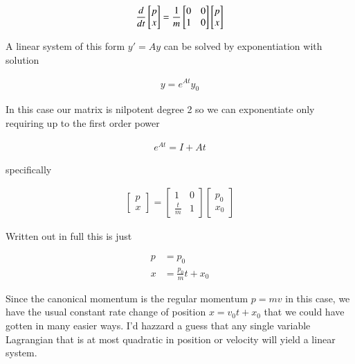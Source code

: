 \begin{align}\label{eqn:hamiltonian:boo4}
\frac{d}{dt}
\begin{bmatrix}
p \\
x
\end{bmatrix}
=
\frac{1}{m}
\begin{bmatrix}
0 & 0 \\
1 & 0
\end{bmatrix}
\begin{bmatrix}
p \\
x
\end{bmatrix}
\end{align}

A linear system of this form $y' = A y$ can be solved by exponentiation with solution

\begin{align}\label{eqn:hamiltonian:boo5}
y = e^{A t} y_0
\end{align}

In this case our matrix is nilpotent degree 2 so we can exponentiate only requiring up to the first order power

\begin{align}\label{eqn:hamiltonian:boo6}
e^{A t} = I + A t
\end{align}

specifically

\begin{align}\label{eqn:hamiltonian:boo7}
\begin{bmatrix}
p \\
x
\end{bmatrix}
=
\begin{bmatrix}
1 & 0 \\
\frac{t}{m} & 1
\end{bmatrix}
\begin{bmatrix}
p_0 \\
x_0
\end{bmatrix}
\end{align}

Written out in full this is just

\begin{align}\label{eqn:hamiltonian:boo8}
p &= p_0 \\
x &= \frac{p_0}{m} t + x_0
\end{align}

Since the canonical momentum is the regular momentum $p = m v$ in this case, we have the usual constant rate change of position $x = v_0 t + x_0$ that we could have gotten in many easier ways.  I'd hazzard a guess that any single variable Lagrangian that is at most quadratic in position or velocity will yield a linear system.

